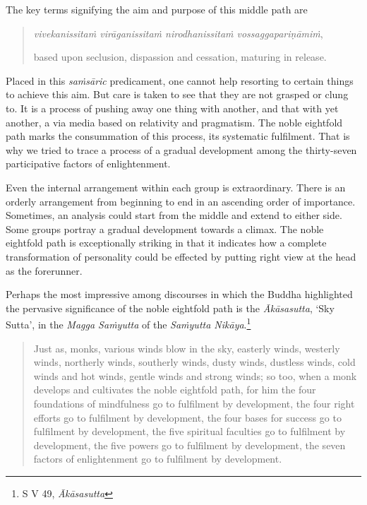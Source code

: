 The key terms signifying the aim and purpose of this middle path are

\begin{quote}
\emph{vivekanissitaṁ virāganissitaṁ nirodhanissitaṁ vossaggapariṇāmiṁ},

based upon seclusion, dispassion and cessation, maturing in release.
\end{quote}

Placed in this \emph{saṁsāric} predicament, one cannot help resorting to certain things to achieve this aim. But care is taken to see that they are not grasped or clung to. It is a process of pushing away one thing with another, and that with yet another, a via media based on relativity and pragmatism. The noble eightfold path marks the consummation of this process, its systematic fulfilment. That is why we tried to trace a process of a gradual development among the thirty-seven participative factors of enlightenment.

Even the internal arrangement within each group is extraordinary. There is an orderly arrangement from beginning to end in an ascending order of importance. Sometimes, an analysis could start from the middle and extend to either side. Some groups portray a gradual development towards a climax. The noble eightfold path is exceptionally striking in that it indicates how a complete transformation of personality could be effected by putting right view at the head as the forerunner.

Perhaps the most impressive among discourses in which the Buddha highlighted the pervasive significance of the noble eightfold path is the \emph{Ākāsasutta}, `Sky Sutta', in the \emph{Magga Saṁyutta} of the \emph{Saṁyutta Nikāya}.\footnote{S V 49, \emph{Ākāsasutta}}

\enlargethispage{\baselineskip}

\begin{quote}
Just as, monks, various winds blow in the sky, easterly winds, westerly winds, northerly winds, southerly winds, dusty winds, dustless winds, cold winds and hot winds, gentle winds and strong winds; so too, when a monk develops and cultivates the noble eightfold path, for him the four foundations of mindfulness go to fulfilment by development, the four right efforts go to fulfilment by development, the four bases for success go to fulfilment by development, the five spiritual faculties go to fulfilment by development, the five powers go to fulfilment by development, the seven factors of enlightenment go to fulfilment by development.
\end{quote}

